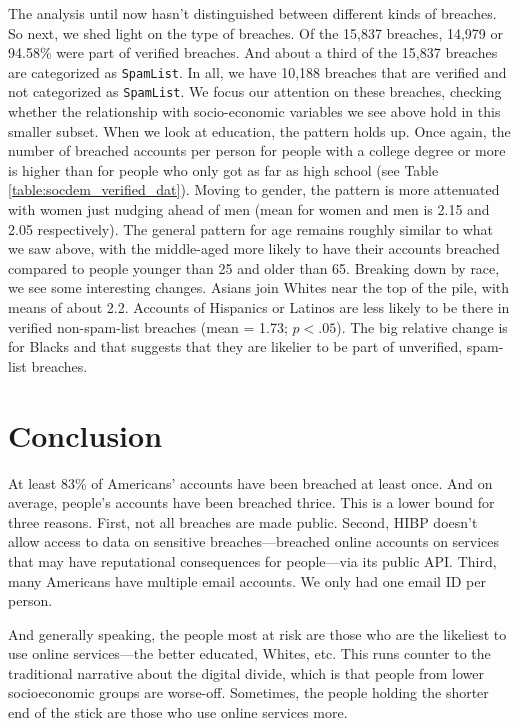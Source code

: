 \documentclass[12pt, letterpaper]{article}
\begin{document}
The analysis until now hasn't distinguished between different kinds of breaches. So next, we shed light on the type of breaches.  Of the 15,837 breaches, 14,979 or 94.58\% were part of verified breaches. And about a third of the 15,837 breaches are categorized as \texttt{SpamList}. In all, we have 10,188 breaches that are verified and not categorized as \texttt{SpamList}. We focus our attention on these breaches, checking whether the relationship with socio-economic variables we see above hold in this smaller subset. When we look at education, the pattern holds up. Once again, the number of breached accounts per person for people with a college degree or more is higher than for people who only got as far as high school (see Table \ref{table:socdem_verified_dat}). Moving to gender, the pattern is more attenuated with women just nudging ahead of men (mean for women and men is 2.15 and 2.05 respectively).  The general pattern for age remains roughly similar to what we saw above, with the middle-aged more likely to have their accounts breached compared to people younger than 25 and older than 65. Breaking down by race, we see some interesting changes. Asians join Whites near the top of the pile, with means of about 2.2. Accounts of Hispanics or Latinos are less likely to be there in verified non-spam-list breaches (mean = 1.73; $p < .05$). The big relative change is for Blacks and that suggests that they are likelier to be part of unverified, spam-list breaches.



\section*{Conclusion}
At least 83\% of Americans' accounts have been breached at least once. And on average, people's accounts have been breached thrice. This is a lower bound for three reasons. First, not all breaches are made public. Second, HIBP doesn't allow access to data on sensitive breaches---breached online accounts on services that may have reputational consequences for people---via its public API. Third, many Americans have multiple email accounts. We only had one email ID per person. 

And generally speaking, the people most at risk are those who are the likeliest to use online services---the better educated, Whites, etc. This runs counter to the traditional narrative about the digital divide, which is that people from lower socioeconomic groups are worse-off. Sometimes, the people holding the shorter end of the stick are those who use online services more.
\end{document}
